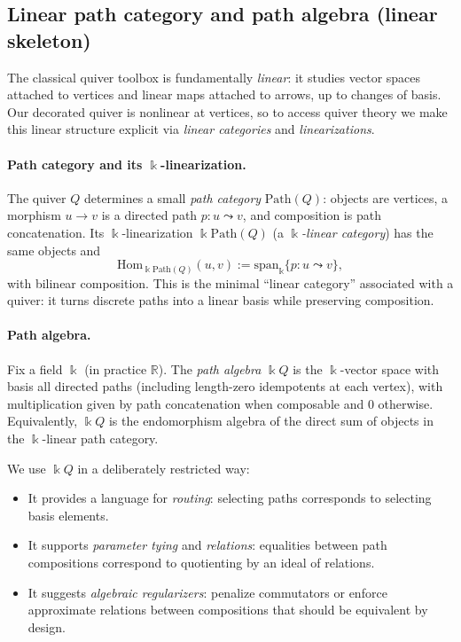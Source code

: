 \documentclass[11pt]{article}
\theoremstyle{definition}
\theoremstyle{plain}
\theoremstyle{remark}
\newcommand{\R}{\mathbb{R}}
\begin{document}
\subsection{Linear path category and path algebra (linear skeleton)}
\label{sec:linear-path-category}

The classical quiver toolbox is fundamentally \emph{linear}: it studies vector spaces attached to vertices and linear maps attached to arrows, up to changes of basis.
Our decorated quiver is nonlinear at vertices, so to access quiver theory we make this linear structure explicit via \emph{linear categories} and \emph{linearizations}.

\paragraph{Path category and its $\Bbbk$-linearization.}
The quiver $Q$ determines a small \emph{path category} $\mathrm{Path}(Q)$:
objects are vertices, a morphism $u\to v$ is a directed path $p:u\leadsto v$, and composition is path concatenation.
Its $\Bbbk$-linearization $\Bbbk\mathrm{Path}(Q)$ (a \emph{$\Bbbk$-linear category}) has the same objects and
\[
\mathrm{Hom}_{\Bbbk\mathrm{Path}(Q)}(u,v) := \mathrm{span}_{\Bbbk}\{p:u\leadsto v\},
\]
with bilinear composition.
This is the minimal ``linear category'' associated with a quiver: it turns discrete paths into a linear basis while preserving composition.

\paragraph{Path algebra.}
Fix a field $\Bbbk$ (in practice $\R$).
The \emph{path algebra} $\Bbbk Q$ is the $\Bbbk$-vector space with basis all directed paths (including length-zero idempotents at each vertex), with multiplication given by path concatenation when composable and $0$ otherwise.
Equivalently, $\Bbbk Q$ is the endomorphism algebra of the direct sum of objects in the $\Bbbk$-linear path category.

We use $\Bbbk Q$ in a deliberately restricted way:
\begin{itemize}[leftmargin=2em]
\item It provides a language for \emph{routing}: selecting paths corresponds to selecting basis elements.
\item It supports \emph{parameter tying} and \emph{relations}: equalities between path compositions correspond to quotienting by an ideal of relations.
\item It suggests \emph{algebraic regularizers}: penalize commutators or enforce approximate relations between compositions that should be equivalent by design.
\end{itemize}
\end{document}
